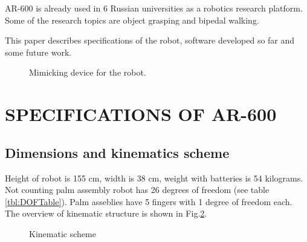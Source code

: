\documentclass[letterpaper, 10 pt, conference]{ieeeconf}  %
\begin{document}
AR-600 is already used in 6 Russian universities as a robotics research
platform. Some of the research topics are object grasping and bipedal walking.

This paper describes specifications of the robot, software developed so far and
some future work.

\begin{figure} [thpb]
      \centering
      \caption{Mimicking device for the robot.}
      \label{img:suit}
\end{figure}

\section{SPECIFICATIONS OF AR-600}

\subsection{Dimensions and kinematics scheme}

Height of robot is 155 cm, width is 38 cm, weight with batteries is 54
kilograms.
Not counting palm assembly robot has 26 degrees of freedom (see table
\ref{tbl:DOFTable}).
Palm asseblies have 5 fingers with 1 degree of freedom each. The overview of
kinematic structure is shown in Fig.\ref{img:kinematic}.

 \begin{figure}[thpb]
      \centering
      \caption{Kinematic scheme}
      \label{img:kinematic}
   \end{figure}
 
\end{document}
